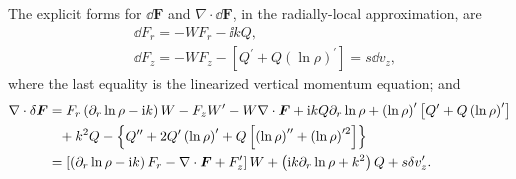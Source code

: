 
The explicit forms for $\dd\bm{F}$ and $\nabla\cdot\dd\bm{F}$, in the
radially-local approximation, are
\begin{align}
  &\dd F_r = - W F_r - \ii k Q,\\
  &\dd F_z = - W F_z - \left[Q^\prime + Q
    \left(\ln{\rho}\right)^\prime\right]  = s\dd v_z, 
\end{align} 
where the last equality is the linearized
vertical momentum equation; and 
\begin{align}
  \nabla\cdot\delta\bm{F} &= F_r\left(\partial_r\ln{\rho} - \mathrm{i} k \right)W - F_z
  W^\prime - W \nabla\cdot\bm{F} + \mathrm{i} kQ \partial_r\ln{\rho} +
  \left(\ln{\rho}\right)^\prime\left[Q^\prime + Q
    \left(\ln{\rho}\right)^\prime\right] \notag\\
  & \phantom{=} + k^2 Q - \left\{Q^{\prime\prime} + 2
    Q^\prime\left(\ln{\rho}\right)^\prime
    + Q\left[\left(\ln{\rho}\right)^{\prime\prime}+\left(\ln{\rho}\right)^{\prime
      2}\right]\right\}\notag\\
    &= \left[\left(\partial_r\ln{\rho}-\mathrm{i} k\right)F_r - \nabla\cdot\bm{F} +
      F_z^\prime\right]W + \left(\mathrm{i} k \partial_r\ln{\rho} + k^2\right)Q +
    s\delta v_z^\prime.
\end{align}




